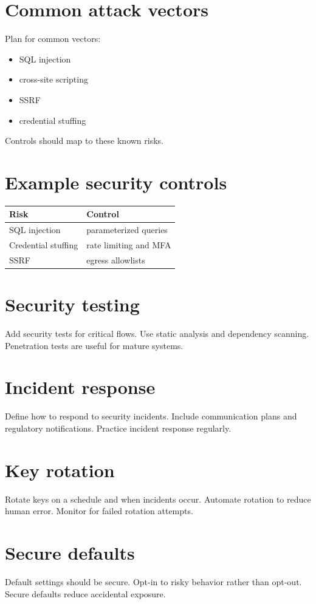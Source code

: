 \section{Common attack vectors}
Plan for common vectors:
\begin{itemize}[nosep]
  \item SQL injection
  \item cross-site scripting
  \item SSRF
  \item credential stuffing
\end{itemize}
Controls should map to these known risks.

\section{Example security controls}
\begin{tabularx}{\textwidth}{@{}lX@{}}
\toprule
Risk & Control \\
\midrule
SQL injection & parameterized queries \\
Credential stuffing & rate limiting and MFA \\
SSRF & egress allowlists \\
\bottomrule
\end{tabularx}

\section{Security testing}
Add security tests for critical flows.
Use static analysis and dependency scanning.
Penetration tests are useful for mature systems.

\section{Incident response}
Define how to respond to security incidents.
Include communication plans and regulatory notifications.
Practice incident response regularly.

\section{Key rotation}
Rotate keys on a schedule and when incidents occur.
Automate rotation to reduce human error.
Monitor for failed rotation attempts.

\section{Secure defaults}
Default settings should be secure.
Opt-in to risky behavior rather than opt-out.
Secure defaults reduce accidental exposure.

